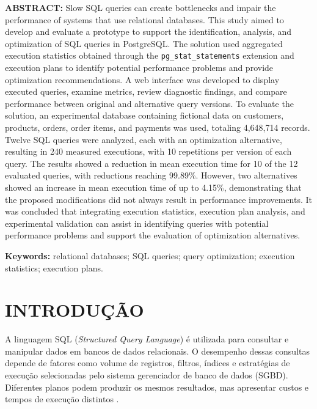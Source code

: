 \documentclass{UNESC}
\begin{document}
\vspace{1em}
\noindent
\textbf{ABSTRACT:}
Slow SQL queries can create bottlenecks and impair the performance of systems that use relational databases. This study aimed to develop and evaluate a prototype to support the identification, analysis, and optimization of SQL queries in PostgreSQL. The solution used aggregated execution statistics obtained through the \texttt{pg\_stat\_statements} extension and execution plans to identify potential performance problems and provide optimization recommendations. A web interface was developed to display executed queries, examine metrics, review diagnostic findings, and compare performance between original and alternative query versions. To evaluate the solution, an experimental database containing fictional data on customers, products, orders, order items, and payments was used, totaling 4,648,714 records. Twelve SQL queries were analyzed, each with an optimization alternative, resulting in 240 measured executions, with 10 repetitions per version of each query. The results showed a reduction in mean execution time for 10 of the 12 evaluated queries, with reductions reaching 99.89\%. However, two alternatives showed an increase in mean execution time of up to 4.15\%, demonstrating that the proposed modifications did not always result in performance improvements. It was concluded that integrating execution statistics, execution plan analysis, and experimental validation can assist in identifying queries with potential performance problems and support the evaluation of optimization alternatives.

\noindent
\textbf{Keywords:} relational databases; SQL queries; query optimization; execution statistics; execution plans.




\section{INTRODUÇÃO}

A linguagem SQL (\textit{Structured Query Language}) é utilizada para consultar e manipular dados em bancos de dados relacionais. O desempenho dessas consultas depende de fatores como volume de registros, filtros, índices e estratégias de execução selecionadas pelo sistema gerenciador de banco de dados (SGBD). Diferentes planos podem produzir os mesmos resultados, mas apresentar custos e tempos de execução distintos \cite{lan2021optimizer}.
\end{document}
